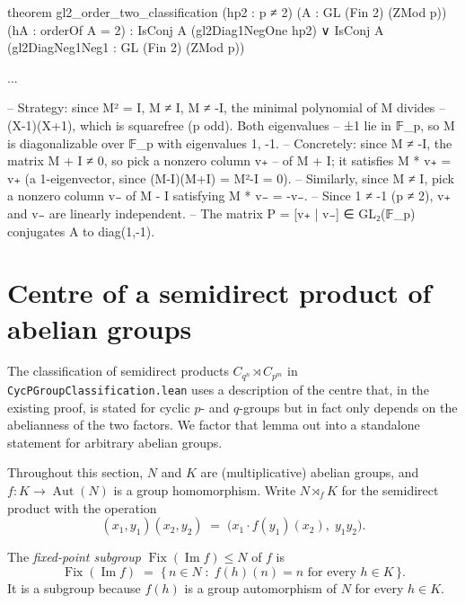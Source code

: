 theorem gl2_order_two_classification (hp2 : p ≠ 2) (A : GL (Fin 2) (ZMod p))
    (hA : orderOf A = 2) :
    IsConj A (gl2Diag1NegOne hp2) ∨ IsConj A (gl2DiagNeg1Neg1 : GL (Fin 2) (ZMod p))

...

-- Strategy: since M² = I, M ≠ I, M ≠ -I, the minimal polynomial of M divides
    -- (X-1)(X+1), which is squarefree (p odd). Both eigenvalues
    -- ±1 lie in 𝔽_p, so M is diagonalizable over 𝔽_p with eigenvalues {1, -1}.
    -- Concretely: since M ≠ -I, the matrix M + I ≠ 0, so pick a nonzero column v₊
    -- of M + I; it satisfies M * v₊ = v₊ (a 1-eigenvector, since (M-I)(M+I) = M²-I = 0).
    -- Similarly, since M ≠ I, pick a nonzero column v₋ of M - I satisfying M * v₋ = -v₋.
    -- Since 1 ≠ -1 (p ≠ 2), v₊ and v₋ are linearly independent.
    -- The matrix P = [v₊ | v₋] ∈ GL₂(𝔽_p) conjugates A to diag(1,-1).




\section{Centre of a semidirect product of abelian groups}

The classification of semidirect products $C_{q^n}\rtimes C_{p^m}$ in
\texttt{CycPGroupClassification.lean} uses a description of the centre that, in
the existing proof, is stated for cyclic $p$- and $q$-groups but in fact only
depends on the abelianness of the two factors. We factor that lemma out into a
standalone statement for arbitrary abelian groups.

Throughout this section, $N$ and $K$ are (multiplicative) abelian groups, and
$f : K \to \operatorname{Aut}(N)$ is a group homomorphism. Write $N\rtimes_f K$
for the semidirect product with the operation
\[
  (x_1, y_1)(x_2, y_2) \;=\; \bigl(x_1\cdot f(y_1)(x_2),\; y_1 y_2\bigr).
\]

\begin{definition}\label{def:fixedPointsSubgroup}
\leanok
The \emph{fixed-point subgroup} $\operatorname{Fix}(\operatorname{Im} f)\le N$
of $f$ is
\[
  \operatorname{Fix}(\operatorname{Im} f)
  \;=\; \{\, n \in N \;:\; f(h)(n) = n \text{ for every } h \in K \,\}.
\]
It is a subgroup because $f(h)$ is a group automorphism of $N$ for every
$h \in K$.
\end{definition}

